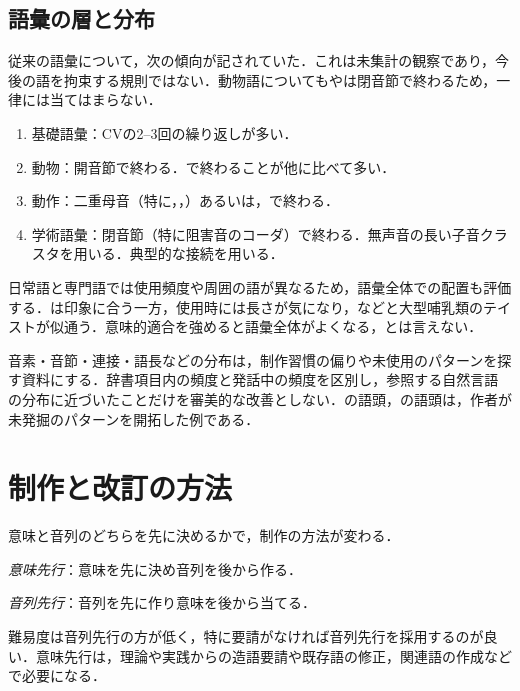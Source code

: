 \documentclass[../../main-detail.tex]{subfiles}
\begin{document}
\subsection{語彙の層と分布}
従来の語彙について，次の傾向が記されていた．これは未集計の観察であり，今後の語を拘束する規則ではない．動物語についてもやは閉音節で終わるため，一律には当てはまらない．
\begin{enumerate}
    \item 基礎語彙：CVの2--3回の繰り返しが多い．
    \item 動物：開音節で終わる．で終わることが他に比べて多い．
    \item 動作：二重母音（特に，，）あるいは，で終わる．
    \item 学術語彙：閉音節（特に阻害音のコーダ）で終わる．無声音の長い子音クラスタを用いる．典型的な接続を用いる．
\end{enumerate}

日常語と専門語では使用頻度や周囲の語が異なるため，語彙全体での配置も評価する．は印象に合う一方，使用時には長さが気になり，などと大型哺乳類のテイストが似通う．意味的適合を強めると語彙全体がよくなる，とは言えない．

音素・音節・連接・語長などの分布は，制作習慣の偏りや未使用のパターンを探す資料にする．辞書項目内の頻度と発話中の頻度を区別し，参照する自然言語の分布に近づいたことだけを審美的な改善としない．の語頭，の語頭は，作者が未発掘のパターンを開拓した例である．

\section{制作と改訂の方法}
意味と音列のどちらを先に決めるかで，制作の方法が変わる．
\begin{enumerate*}
    \item \emph{意味先行}：意味を先に決め音列を後から作る．
    \item \emph{音列先行}：音列を先に作り意味を後から当てる．
\end{enumerate*}
難易度は音列先行の方が低く，特に要請がなければ音列先行を採用するのが良い．意味先行は，理論や実践からの造語要請や既存語の修正，関連語の作成などで必要になる．
\end{document}
